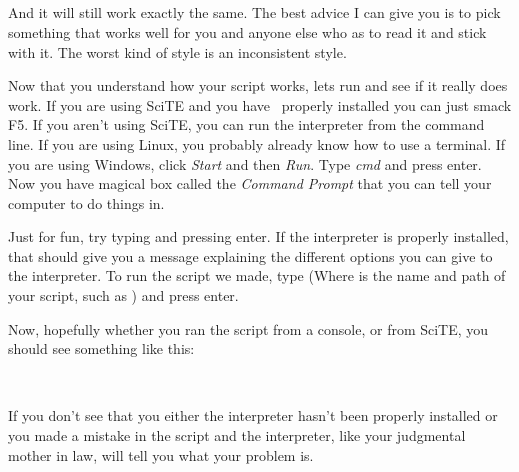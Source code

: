 \begin{SSCodeBox}
 \\
 \\
 \\
\scitea{} \\
 \\
\scitel{:} \\
 \\
\scitea{\{} \\
\scitea{;}
\scitea{\}} \\
\end{SSCodeBox}

And it will still work exactly the same.  The best advice I can give you is to pick something that works well for you and anyone else who as to read it and stick with it.  The worst kind of style is an inconsistent style.

Now that you understand how your script works, lets run and see if it really does work.  If you are using SciTE and you have \SSquared\ properly installed  you can just smack F5.  If you aren't using SciTE, you can run the interpreter from the command line.  If you are using Linux, you probably already know how to use a terminal.  If you are using Windows, click \emph{Start} and then \emph{Run}.  Type \emph{cmd} and press enter.  Now you have magical box called the \emph{Command Prompt} that you can tell your computer to do things in.

Just for fun, try typing  and pressing enter.  If the interpreter is properly installed, that should give you a message explaining the different options you can give to the interpreter.  To run the script we made, type  (Where  is the name and path of your script, such as ) and press enter.

Now, hopefully whether you ran the script from a console, or from SciTE, you should see something like this:

\begin{SSCodeBox}
 \\
\end{SSCodeBox}

If you don't see that you either the interpreter hasn't been properly installed or you made a mistake in the script and the interpreter, like your judgmental mother in law, will tell you what your problem is.

